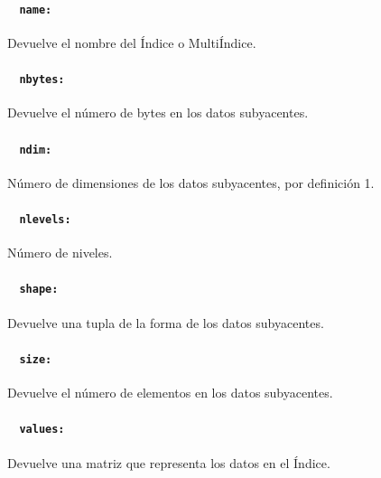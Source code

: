 \paragraph{~\hspace{2em} \texttt{name:}} Devuelve el nombre del Índice o MultiÍndice.
\paragraph{~\hspace{2em} \texttt{nbytes:}} Devuelve el número de bytes en los datos subyacentes.
\paragraph{~\hspace{2em} \texttt{ndim:}} Número de dimensiones de los datos subyacentes, por definición 1.
\paragraph{~\hspace{2em} \texttt{nlevels:}} Número de niveles.
\paragraph{~\hspace{2em} \texttt{shape:}} Devuelve una tupla de la forma de los datos subyacentes.
\paragraph{~\hspace{2em} \texttt{size:}} Devuelve el número de elementos en los datos subyacentes.
\paragraph{~\hspace{2em} \texttt{values:}} Devuelve una matriz que representa los datos en el Índice.
